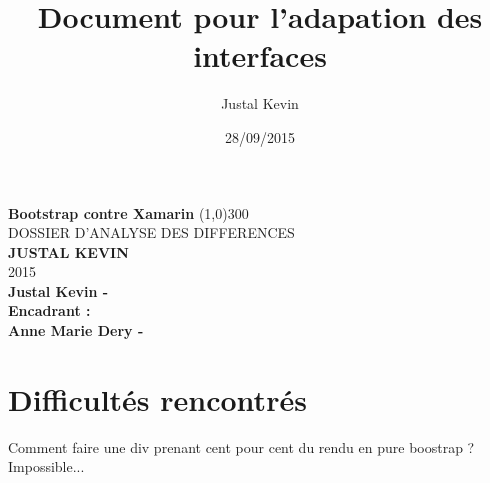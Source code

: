 \documentclass{article}
\title{Document pour l'adapation des interfaces}
\author{Justal Kevin}
\date{28/09/2015}
\begin{document}
\begin{center}
\textbf{\Huge{Bootstrap contre Xamarin}}
\line(1,0){300}\\
DOSSIER D'ANALYSE DES DIFFERENCES\\
\vspace{3cm}
\textbf{\Large{JUSTAL KEVIN}}\\
2015\\
\vspace{2cm}
\textbf{Justal Kevin -  \color{black}{- SI5 - IHM}}\\
\vspace{13cm}
\textbf{Encadrant :}\\
\textbf{Anne Marie Dery - }
\end{center}

\newpage
\newpage
\tableofcontents

\newpage
\section{Difficult\'es rencontr\'es}
Comment faire une div prenant cent pour cent du rendu en pure boostrap ? Impossible...
\end{document}
